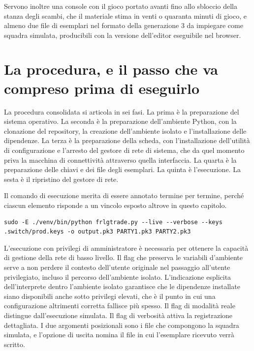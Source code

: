 Servono inoltre una console con il gioco portato avanti fino allo sbloccio della stanza degli scambi, che il materiale stima in venti o quaranta minuti di gioco, e almeno due file di esemplari nel formato della generazione 3 da impiegare come squadra simulata, producibili con la versione dell'editor eseguibile nel browser.

\section{La procedura, e il passo che va compreso prima di eseguirlo}

La procedura consolidata si articola in sei fasi. La prima è la preparazione del sistema operativo. La seconda è la preparazione dell'ambiente Python, con la clonazione del repository, la creazione dell'ambiente isolato e l'installazione delle dipendenze. La terza è la preparazione della scheda, con l'installazione dell'utilità di configurazione e l'arresto del gestore di rete di sistema, che da quel momento priva la macchina di connettività attraverso quella interfaccia. La quarta è la preparazione delle chiavi e dei file degli esemplari. La quinta è l'esecuzione. La sesta è il ripristino del gestore di rete.

Il comando di esecuzione merita di essere annotato termine per termine, perché ciascun elemento risponde a un vincolo esposto altrove in questo capitolo.

{\scriptsize
\begin{verbatim}
sudo -E ./venv/bin/python frlgtrade.py --live --verbose --keys .switch/prod.keys -o output.pk3 PARTY1.pk3 PARTY2.pk3
\end{verbatim}
}

L'esecuzione con privilegi di amministratore è necessaria per ottenere la capacità di gestione della rete di basso livello. Il flag che preserva le variabili d'ambiente serve a non perdere il contesto dell'utente originale nel passaggio all'utente privilegiato, incluso il percorso dell'ambiente isolato. L'indicazione esplicita dell'interprete dentro l'ambiente isolato garantisce che le dipendenze installate siano disponibili anche sotto privilegi elevati, che è il punto in cui una configurazione altrimenti corretta fallisce più spesso. Il flag di modalità reale distingue dall'esecuzione simulata. Il flag di verbosità attiva la registrazione dettagliata. I due argomenti posizionali sono i file che compongono la squadra simulata, e l'opzione di uscita nomina il file in cui l'esemplare ricevuto verrà scritto.

